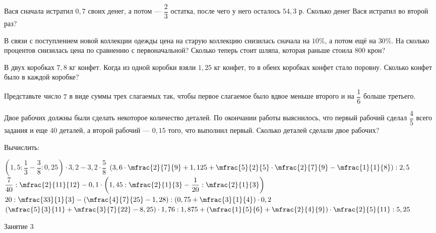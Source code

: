 \begin{class}[number=2]
	\begin{listofex}
		\item Вася сначала истратил \(0,7\) своих денег, а потом --- \(\dfrac{2}{3} \) остатка, после чего у него осталось \(54,3\) р. Сколько денег Вася истратил во второй раз?
		\item В связи с поступлением новой коллекции одежды цена на старую коллекцию снизилась сначала на \(10\%\), а потом ещё на \(30\%\). На сколько процентов снизилась цена по сравнению с первоначальной? Сколько теперь стоит шляпа, которая раньше стоила \(800\) крон?
		\item В двух коробках \(7,8\) кг конфет. Когда из одной коробки взяли \(1,25\) кг конфет, то в обеих коробках конфет стало поровну. Сколько конфет было в каждой коробке?
		\item Представьте число \(7\) в виде суммы трех слагаемых так, чтобы первое слагаемое было вдвое меньше второго и на \(\dfrac{1}{6}\) больше третьего.
		\item Двое рабочих должны были сделать некоторое количество деталей. По окончании работы выяснилось, что первый рабочий сделал \(\dfrac{4}{5}\) всего задания и еще \(40\) деталей, а второй рабочий --- \(0,15\) того, что выполнил первый. Сколько деталей сделали двое рабочих?
		\item Вычислить:
			\begin{itasks}[1]
				\task \( \left(  1,5 : \dfrac{1}{3} - \dfrac{3}{8} : 0,25 \right) \cdot 3,2 - 3,2 \cdot \dfrac{5}{8} \)
				\task \( \left(  3,6 \cdot \mfrac{2}{7}{9} + 1,125 + \mfrac{5}{2}{5} \cdot  \mfrac{2}{7}{9} - \mfrac{1}{1}{8} \right) : 2,5 \)
				\task \( \dfrac{7}{40} : \mfrac{2}{11}{12} - 0,1 \cdot \left( 1,45 : \mfrac{2}{1}{3} - \dfrac{1}{20} : \mfrac{2}{1}{3} \right) \)
				\task \( 20 : \mfrac{33}{1}{3} - \left( \mfrac{4}{7}{25} - 1,28 \right) : \left( 0,75 + \mfrac{3}{1}{4} \right) \cdot 0,2 \)
				\task \( \left( \mfrac{5}{3}{11} + \mfrac{3}{7}{22} - 8,25 \right) \cdot 1,76 : 1,875 + \left( \mfrac{1}{5}{6} + \mfrac{2}{4}{9} \right) \cdot \mfrac{2}{5}{11} : 5,25 \)
			\end{itasks}
	\end{listofex}
\end{class}

\begin{class}[number=3]
	\begin{listofex}
		\item Занятие 3
	\end{listofex}
\end{class}


